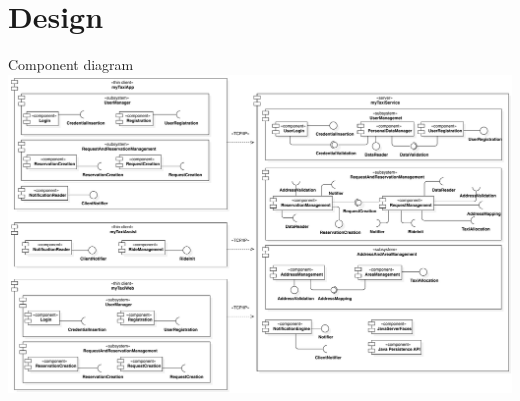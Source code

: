    \section{Design}




\begin{frame}{Component diagram}
	\includegraphics[width=\textwidth ]{img/ComponentView__ComponentDiagram_1}
\end{frame}